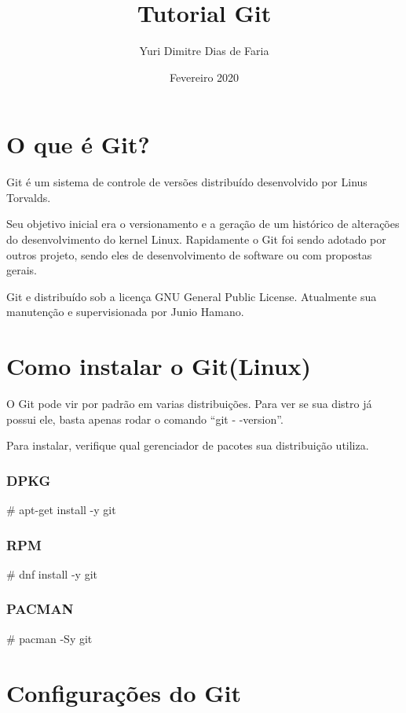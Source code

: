 \documentclass[]{article}
\title{Tutorial Git}
\author{Yuri Dimitre Dias de Faria}
\date{Fevereiro 2020}
\begin{document}
\maketitle    

\section{O que é Git?}


Git é um sistema de controle de versões distribuído desenvolvido por Linus Torvalds.


Seu objetivo inicial era o versionamento e a geração de um histórico de alterações do desenvolvimento do kernel Linux.
Rapidamente o Git foi sendo adotado por outros projeto, sendo eles de desenvolvimento de software ou com propostas gerais.


Git e distribuído sob a licença GNU General Public License. Atualmente sua manutenção e supervisionada por Junio Hamano.

\section{Como instalar o Git(Linux)}


O Git pode vir por padrão em varias distribuições. Para ver se sua distro já possui ele, basta apenas rodar o comando ``git - -version''.


Para instalar, verifique qual gerenciador de pacotes sua distribuição utiliza.

\subsubsection*{DPKG}

\# apt-get install -y git 

\subsubsection*{RPM}

\# dnf install -y git    

\subsubsection*{PACMAN}

\# pacman -Sy git



\section{Configurações do Git}
\end{document}

